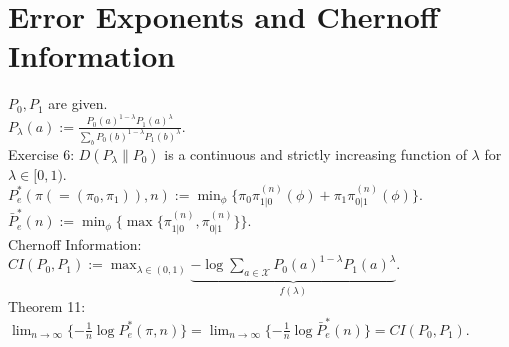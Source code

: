 \section{Error Exponents and Chernoff Information}

$P_0, P_1$ are given.\\
$P_\lambda(a):=\frac{P_0(a)^{1-\lambda}P_1(a)^\lambda}{\sum_bP_0(b)^{1-\lambda}P_1(b)^\lambda}$.\\
Exercise 6: $D(P_\lambda\|P_0)$ is a continuous and strictly increasing function of $\lambda$ for $\lambda\in[0, 1)$.\\
$P^*_e(\pi(=(\pi_0, \pi_1)), n):=\min_\phi\{\pi_0\pi_{1|0}^{(n)}(\phi)+\pi_1\pi_{0|1}^{(n)}(\phi)\}$.\\
$\bar P^*_e(n):=\min_\phi\{\max\{\pi^{(n)}_{1|0}, \pi_{0|1}^{(n)}\}\}$.\\
Chernoff Information: $CI(P_0, P_1):=\max_{\lambda\in(0, 1)}\underbrace{-\log\sum_{a\in\mathcal{X}}P_0(a)^{1-\lambda}P_1(a)^\lambda}_{f(\lambda)}$.\\
Theorem 11: $\lim_{n\to\infty}\{-\frac1n\log P_e^*(\pi, n)\}=\lim_{n\to\infty}\{-\frac1n\log\bar P^*_e(n)\}=CI(P_0, P_1)$.

